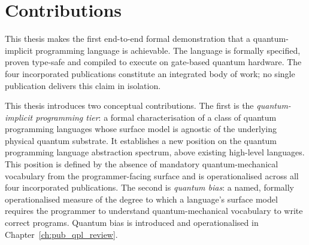 \section{Contributions}\label{sec:introduction:contributions}
This thesis makes the first end-to-end formal demonstration that a quantum-implicit programming language is achievable.
The language is formally specified, proven type-safe and compiled to execute on gate-based quantum hardware.
The four incorporated publications constitute an integrated body of work; no single publication delivers this claim in isolation.

This thesis introduces two conceptual contributions.
The first is the \textit{quantum-implicit programming tier}: a formal characterisation of a class of quantum programming languages whose surface model is agnostic of the underlying physical quantum substrate.
It establishes a new position on the quantum programming language abstraction spectrum, above existing high-level languages.
This position is defined by the absence of mandatory quantum-mechanical vocabulary from the programmer-facing surface and is operationalised across all four incorporated publications.
The second is \textit{quantum bias}: a named, formally operationalised measure of the degree to which a language's surface model requires the programmer to understand quantum-mechanical vocabulary to write correct programs.
Quantum bias is introduced and operationalised in Chapter~\ref{ch:pub_qpl_review}.

